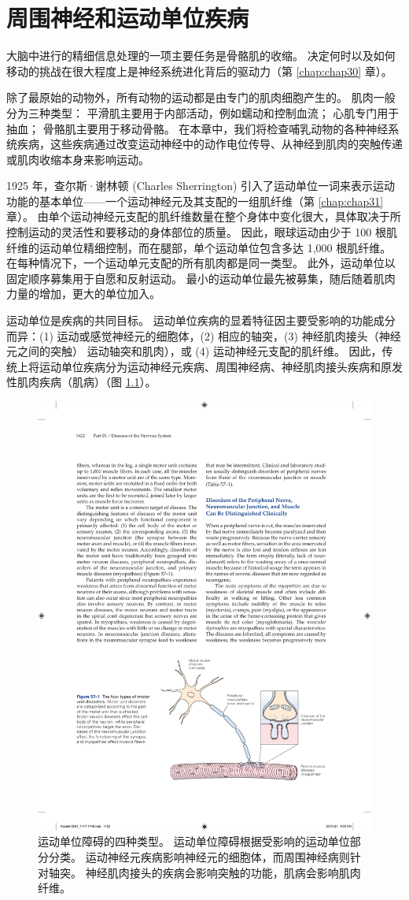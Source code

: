 \chapter{周围神经和运动单位疾病} \label{chap:chap57}

大脑中进行的精细信息处理的一项主要任务是骨骼肌的收缩。
决定何时以及如何移动的挑战在很大程度上是神经系统进化背后的驱动力（第 \ref{chap:chap30} 章）。


除了最原始的动物外，所有动物的运动都是由专门的肌肉细胞产生的。
肌肉一般分为三种类型： 平滑肌主要用于内部活动，例如蠕动和控制血流； 心肌专门用于抽血； 骨骼肌主要用于移动骨骼。
在本章中，我们将检查哺乳动物的各种神经系统疾病，这些疾病通过改变运动神经中的动作电位传导、从神经到肌肉的突触传递或肌肉收缩本身来影响运动。


1925 年，查尔斯·谢林顿 (Charles Sherrington) 引入了运动单位一词来表示运动功能的基本单位——一个运动神经元及其支配的一组肌纤维（第 \ref{chap:chap31} 章）。
由单个运动神经元支配的肌纤维数量在整个身体中变化很大，具体取决于所控制运动的灵活性和要移动的身体部位的质量。
因此，眼球运动由少于 100 根肌纤维的运动单位精细控制，而在腿部，单个运动单位包含多达 1,000 根肌纤维。
在每种情况下，一个运动单元支配的所有肌肉都是同一类型。
此外，运动单位以固定顺序募集用于自愿和反射运动。
最小的运动单位最先被募集，随后随着肌肉力量的增加，更大的单位加入。


运动单位是疾病的共同目标。
运动单位疾病的显着特征因主要受影响的功能成分而异：(1) 运动或感觉神经元的细胞体，(2) 相应的轴突，(3) 神经肌肉接头（神经元之间的突触） 运动轴突和肌肉），或 (4) 运动神经元支配的肌纤维。
因此，传统上将运动单位疾病分为运动神经元疾病、周围神经病、神经肌肉接头疾病和原发性肌肉疾病（肌病）（图 \ref{fig:57_1}）。


\begin{figure}[htbp]
	\centering
	\includegraphics[width=0.7\linewidth]{chap57/fig_57_1}
	\caption{运动单位障碍的四种类型。 运动单位障碍根据受影响的运动单位部分分类。 运动神经元疾病影响神经元的细胞体，而周围神经病则针对轴突。 神经肌肉接头的疾病会影响突触的功能，肌病会影响肌肉纤维。}
	\label{fig:57_1}
\end{figure}


